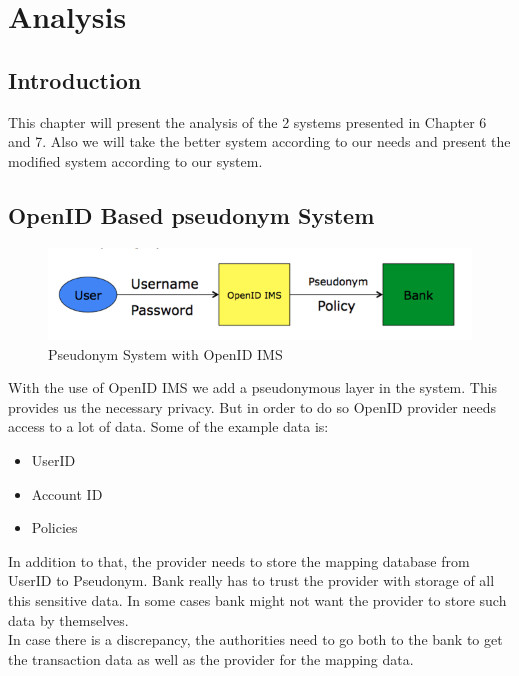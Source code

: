\chapter{Analysis}
\section{Introduction}
This chapter will present the analysis of the 2 systems presented in Chapter 6 and 7. Also we will take the better system according to our needs and present the modified system according to our system.
\section{OpenID Based pseudonym System}
\begin{figure}[h]
	\centering
	\includegraphics[width=\textwidth]{figures/OpenID}
	\caption{Pseudonym System with OpenID IMS}
	\label{fig:OpenID}
\end{figure}
With the use of OpenID IMS we add a pseudonymous layer in the system. This provides us the necessary privacy. But in order to do so OpenID provider needs access to a lot of data. Some of the example data is:
\begin{itemize}
\item UserID
\item Account ID 
\item Policies	
\end{itemize}
In addition to that, the provider needs to store the mapping database from UserID to Pseudonym. Bank really has to trust the provider with storage of all this sensitive data. In some cases bank might not want the provider to store such data by themselves.
\\In case there is a discrepancy, the authorities need to go both to the bank to get the transaction data as well as the provider for the mapping data.
